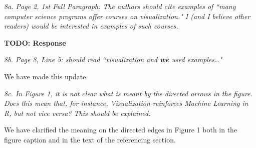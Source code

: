 \documentclass[12pt, letterpaper]{article}
\begin{document}
\vspace{0.5cm}

\noindent\textit{8a. Page 2, 1st Full Paragraph: The authors should cite examples of ``many computer science programs offer courses on visualization." I (and I believe other readers) would be interested in examples of such courses.}

\textbf{TODO: Response}

\vspace{0.5cm}

\noindent\textit{8b. Page 8, Line 5: should read ``visualization and \textbf{we} used examples\ldots"}

We have made this update.

\vspace{0.5cm}

\noindent\textit{8c. In Figure 1, it is not clear what is meant by the directed arrows in the figure. Does this mean that, for instance, Visualization reinforces Machine Learning in R, but not vice versa? This should be explained.}

We have clarified the meaning on the directed edges in Figure 1 both in the figure caption and in the text of the referencing section.
\end{document}
